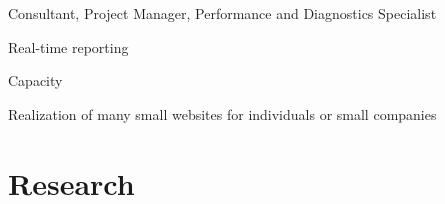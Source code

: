\documentclass[letterpaper]{deedy-resume} %
\begin{document}
\begin{minipage}[t]{0.66\textwidth}
\sectionspace %


\begin{tightitemize}
\item Consultant, Project Manager, Performance and Diagnostics Specialist
\item Real-time reporting
\item Capacity
\end{tightitemize}

\sectionspace %


\begin{tightitemize}
\item Realization of many small websites for individuals or small companies
\end{tightitemize}

\sectionspace %


\section{Research}



\sectionspace %




\end{minipage}
\end{document}
